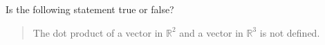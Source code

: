 \documentclass{ximera}
\author{Gregory Hartman \and Matthew Carr}
\begin{document}
\begin{exercise}
Is the following statement true or false?
\begin{quote}
The dot product of a vector in $\mathbb{R}^2$ and a vector in
$\mathbb{R}^3$ is not defined.
\end{quote}

\begin{multipleChoice}
\end{multipleChoice}

\end{exercise}
\end{document}
